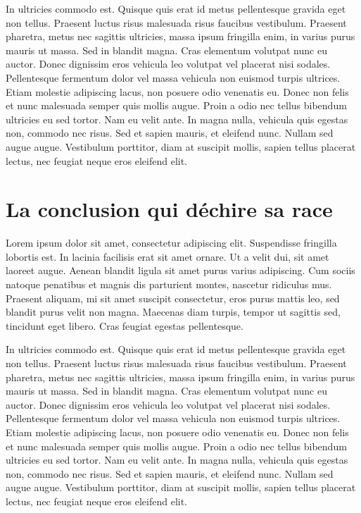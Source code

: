 \documentclass[a4paper,12pt]{report}
\begin{document}
In ultricies commodo est. Quisque quis erat id metus pellentesque
gravida eget non tellus. Praesent luctus risus malesuada risus
faucibus vestibulum. Praesent pharetra, metus nec sagittis ultricies,
massa ipsum fringilla enim, in varius purus mauris ut massa. Sed in
blandit magna. Cras elementum volutpat nunc eu auctor. Donec dignissim
eros vehicula leo volutpat vel placerat nisi sodales. Pellentesque
fermentum dolor vel massa vehicula non euismod turpis ultrices. Etiam
molestie adipiscing lacus, non posuere odio venenatis eu. Donec non
felis et nunc malesuada semper quis mollis augue. Proin a odio nec
tellus bibendum ultricies eu sed tortor. Nam eu velit ante. In magna
nulla, vehicula quis egestas non, commodo nec risus. Sed et sapien
mauris, et eleifend nunc. Nullam sed augue augue. Vestibulum
porttitor, diam at suscipit mollis, sapien tellus placerat lectus, nec
feugiat neque eros eleifend elit.

\chapter[Conclusion]{La conclusion qui déchire sa race}
Lorem ipsum dolor sit amet, consectetur adipiscing elit. Suspendisse
fringilla lobortis est. In lacinia facilisis erat sit amet ornare. Ut
a velit dui, sit amet laoreet augue. Aenean blandit ligula sit amet
purus varius adipiscing. Cum sociis natoque penatibus et magnis dis
parturient montes, nascetur ridiculus mus. Praesent aliquam, mi sit
amet suscipit consectetur, eros purus mattis leo, sed blandit purus
velit non magna. Maecenas diam turpis, tempor ut sagittis sed,
tincidunt eget libero. Cras feugiat egestas pellentesque.

In ultricies commodo est. Quisque quis erat id metus pellentesque
gravida eget non tellus. Praesent luctus risus malesuada risus
faucibus vestibulum. Praesent pharetra, metus nec sagittis ultricies,
massa ipsum fringilla enim, in varius purus mauris ut massa. Sed in
blandit magna. Cras elementum volutpat nunc eu auctor. Donec dignissim
eros vehicula leo volutpat vel placerat nisi sodales. Pellentesque
fermentum dolor vel massa vehicula non euismod turpis ultrices. Etiam
molestie adipiscing lacus, non posuere odio venenatis eu. Donec non
felis et nunc malesuada semper quis mollis augue. Proin a odio nec
tellus bibendum ultricies eu sed tortor. Nam eu velit ante. In magna
nulla, vehicula quis egestas non, commodo nec risus. Sed et sapien
mauris, et eleifend nunc. Nullam sed augue augue. Vestibulum
porttitor, diam at suscipit mollis, sapien tellus placerat lectus, nec
feugiat neque eros eleifend elit.
\end{document}

